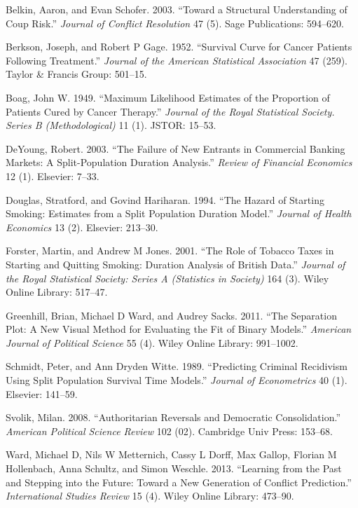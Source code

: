 \documentclass[article]{jss}
\begin{document}
Belkin, Aaron, and Evan Schofer. 2003. ``Toward a Structural
Understanding of Coup Risk.'' \emph{Journal of Conflict Resolution} 47
(5). Sage Publications: 594--620.

Berkson, Joseph, and Robert P Gage. 1952. ``Survival Curve for Cancer
Patients Following Treatment.'' \emph{Journal of the American
Statistical Association} 47 (259). Taylor \& Francis Group: 501--15.

Boag, John W. 1949. ``Maximum Likelihood Estimates of the Proportion of
Patients Cured by Cancer Therapy.'' \emph{Journal of the Royal
Statistical Society. Series B (Methodological)} 11 (1). JSTOR: 15--53.

DeYoung, Robert. 2003. ``The Failure of New Entrants in Commercial
Banking Markets: A Split-Population Duration Analysis.'' \emph{Review of
Financial Economics} 12 (1). Elsevier: 7--33.

Douglas, Stratford, and Govind Hariharan. 1994. ``The Hazard of Starting
Smoking: Estimates from a Split Population Duration Model.''
\emph{Journal of Health Economics} 13 (2). Elsevier: 213--30.

Forster, Martin, and Andrew M Jones. 2001. ``The Role of Tobacco Taxes
in Starting and Quitting Smoking: Duration Analysis of British Data.''
\emph{Journal of the Royal Statistical Society: Series A (Statistics in
Society)} 164 (3). Wiley Online Library: 517--47.

Greenhill, Brian, Michael D Ward, and Audrey Sacks. 2011. ``The
Separation Plot: A New Visual Method for Evaluating the Fit of Binary
Models.'' \emph{American Journal of Political Science} 55 (4). Wiley
Online Library: 991--1002.

Schmidt, Peter, and Ann Dryden Witte. 1989. ``Predicting Criminal
Recidivism Using Split Population Survival Time Models.'' \emph{Journal
of Econometrics} 40 (1). Elsevier: 141--59.

Svolik, Milan. 2008. ``Authoritarian Reversals and Democratic
Consolidation.'' \emph{American Political Science Review} 102 (02).
Cambridge Univ Press: 153--68.

Ward, Michael D, Nils W Metternich, Cassy L Dorff, Max Gallop, Florian M
Hollenbach, Anna Schultz, and Simon Weschle. 2013. ``Learning from the
Past and Stepping into the Future: Toward a New Generation of Conflict
Prediction.'' \emph{International Studies Review} 15 (4). Wiley Online
Library: 473--90.
\end{document}
